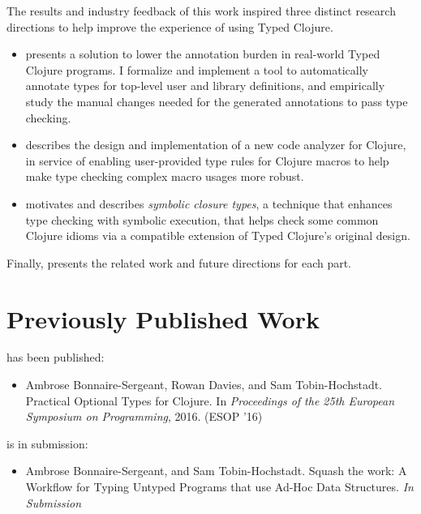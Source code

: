 \documentclass[11pt,final]{iuthesis}
\begin{document}
The results and industry feedback of this work inspired three distinct research directions
to help improve the experience of using Typed Clojure.

\begin{itemize}
  \item
{} presents a solution to lower the annotation burden in real-world Typed Clojure programs.
I formalize and implement a tool to automatically annotate types for top-level
user and library definitions, and empirically study the manual changes needed for the generated annotations
to pass type checking.
  \item
{} describes the design and implementation of a 
new code analyzer for Clojure, in service of enabling user-provided type rules for Clojure macros
    to help make type checking complex macro usages more robust.
\item {} motivates and describes \emph{symbolic closure types},
      a technique that enhances type checking with symbolic execution, that helps check some
      common Clojure idioms via a compatible extension of Typed Clojure's original design.
\end{itemize}

Finally,  presents the related work and future directions for each part.

\section{Previously Published Work}

 has been published:

\begin{itemize}
  \item Ambrose Bonnaire-Sergeant, Rowan Davies, and Sam Tobin-Hochstadt. 
        Practical Optional Types for Clojure. In
        \emph{Proceedings of the 25th European Symposium on Programming}, 2016.
        (ESOP '16)
\end{itemize}

 is in submission:

\begin{itemize}
  \item Ambrose Bonnaire-Sergeant, and Sam Tobin-Hochstadt.
        Squash the work: A Workflow for Typing Untyped Programs that use Ad-Hoc Data Structures.
        \emph{In Submission}
\end{itemize}
\end{document}
